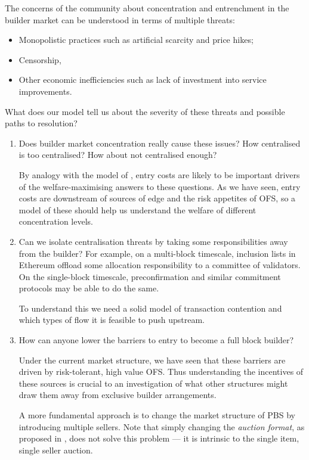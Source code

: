 The concerns of the community about concentration and entrenchment in the builder market can be understood in terms of multiple threats:
%
\begin{itemize}
    \item Monopolistic practices such as artificial scarcity and price hikes;
    \item Censorship,
    \item Other economic inefficiencies such as lack of investment into service improvements.
\end{itemize}
%
What does our model tell us about the severity of these threats and possible paths to resolution?
%
\begin{enumerate}
  \item 
    Does builder market concentration really cause these issues?
    How centralised is too centralised? 
    How about not centralised enough?
    
    By analogy with the model of \cite{chitra2024analysis}, entry costs are likely to be important drivers of the welfare-maximising answers to these questions.
    As we have seen, entry costs are downstream of sources of edge and the risk appetites of OFS, so a model of these should help us understand the welfare of different concentration levels.

  \item
    Can we isolate centralisation threats by taking some responsibilities away from the builder?
    For example, on a multi-block timescale, inclusion lists in Ethereum offload some allocation responsibility to a committee of validators.
    On the single-block timescale, preconfirmation and similar commitment protocols may be able to do the same.
    
    To understand this we need a solid model of transaction contention and which types of flow it is feasible to push upstream.

  \item 
    How can anyone lower the barriers to entry to become a full block builder?
    
    Under the current market structure, we have seen that these barriers are driven by risk-tolerant, high value OFS.
    Thus understanding the incentives of these sources is crucial to an investigation of what other structures might draw them away from exclusive builder arrangements.
    
    A more fundamental approach is to change the market structure of PBS by introducing multiple sellers.
    Note that simply changing the \emph{auction format}, as proposed in \cite[\S6]{oz2024whoa}, does not solve this problem --- it is intrinsic to the single item, single seller auction.

\end{enumerate}

